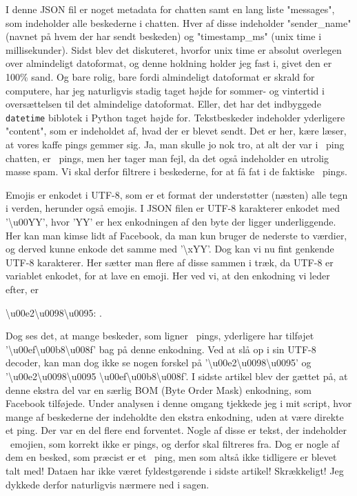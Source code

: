 \begin{article}
I denne JSON fil er noget metadata for chatten samt en lang liste "messages", som indeholder alle beskederne i chatten. Hver af disse indeholder "sender\_name" (navnet på hvem der har sendt beskeden) og "timestamp\_ms" (unix time i millisekunder). Sidst blev det diskuteret, hvorfor unix time er absolut overlegen over almindeligt datoformat, og denne holdning holder jeg fast i, givet den er 100\% sand.
Og bare rolig, bare fordi almindeligt datoformat er skrald for computere, har jeg naturligvis stadig taget højde for sommer- og vintertid i oversættelsen til det almindelige datoformat. Eller, det har det indbyggede \texttt{datetime} biblotek i Python taget højde for.
Tekstbeskeder indeholder yderligere "content", som er indeholdet af, hvad der er blevet sendt. Det er her, kære læser, at vores kaffe pings gemmer sig. Ja, man skulle jo nok tro, at alt der var i \coffee\ ping chatten, er \coffee\ pings, men her tager man fejl, da det også indeholder en utrolig masse spam. Vi skal derfor filtrere i beskederne, for at få fat i de faktiske \coffee\ pings.

Emojis er enkodet i UTF-8, som er et format der understøtter (næsten) alle tegn i verden, herunder også emojis. I JSON filen er UTF-8 karakterer enkodet med '\textbackslash u00YY', hvor 'YY' er hex enkodningen af den byte der ligger underliggende. Her kan man kimse lidt af Facebook, da man kun bruger de nederste to værdier, og derved kunne enkode det samme med '\textbackslash xYY'.
Dog kan vi nu fint genkende UTF-8 karakterer. Her sætter man flere af disse sammen i træk, da UTF-8 er variablet enkodet, for at lave en emoji. Her ved vi, at den enkodning vi leder efter, er
\begin{center}
	\textbackslash u00e2\textbackslash u0098\textbackslash u0095: \coffee \; .
\end{center}
Dog ses det, at mange beskeder, som ligner \coffee\ pings, yderligere har tilføjet '\textbackslash u00ef\textbackslash u00b8\textbackslash u008f' bag på denne enkodning. Ved at slå op i sin UTF-8 decoder, kan man dog ikke se nogen forskel på '\textbackslash u00e2\textbackslash u0098\textbackslash u0095' og '\textbackslash u00e2\textbackslash u0098\textbackslash u0095 \textbackslash u00ef\textbackslash u00b8\textbackslash u008f'. I sidste artikel blev der gættet på, at denne ekstra del var en særlig BOM (Byte Order Mask) enkodning, som Facebook tilføjede.
Under analysen i denne omgang tjekkede jeg i mit script, hvor mange af beskederne der indeholdte den ekstra enkodning, uden at være direkte et ping. Der var en del flere end forventet.
Nogle af disse er tekst, der indeholder \coffee\ emojien, som korrekt ikke er pings, og derfor skal filtreres fra. Dog er nogle af dem en besked, som præcist er et \coffee\ ping, men som altså ikke tidligere er blevet talt med! Dataen har ikke været fyldestgørende i sidste artikel! Skrækkeligt! Jeg dykkede derfor naturligvis nærmere ned i sagen.


\end{article}
